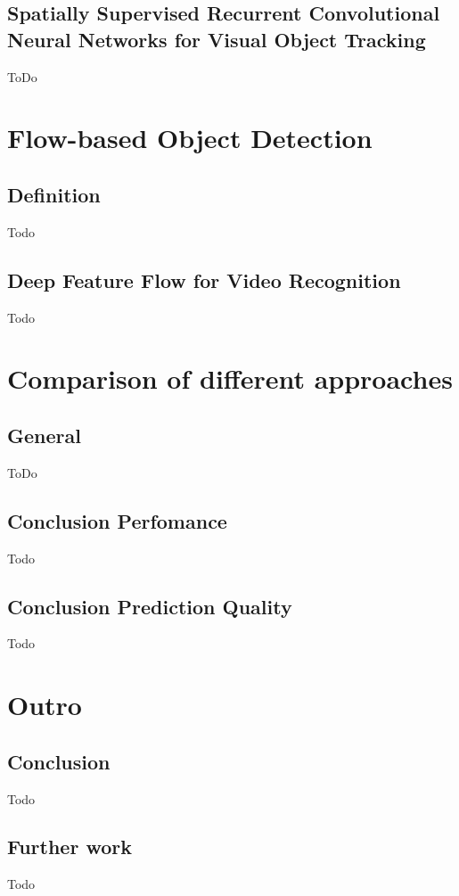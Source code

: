\documentclass[conference]{IEEEtran}
\begin{document}
\subsection{Spatially Supervised Recurrent Convolutional Neural Networks for Visual Object Tracking}
ToDo


\section{Flow-based Object Detection}

\subsection{Definition}
Todo

\subsection{Deep Feature Flow for Video Recognition}
Todo

\section{Comparison of different approaches}

\subsection{General}
ToDo

\subsection{Conclusion Perfomance}
Todo

\subsection{Conclusion Prediction Quality}
Todo


\section{Outro}

\subsection{Conclusion}
Todo

\subsection{Further work}
Todo
\end{document}
